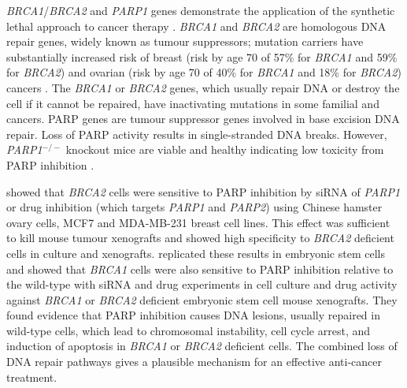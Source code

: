 \textit{BRCA1}/\textit{BRCA2} and \textit{PARP1} genes demonstrate the application of the \gls{synthetic lethal} approach to cancer therapy \citep{Ashworth2008, Kaelin2005}. \textit{BRCA1} and \textit{BRCA2} are homologous \acrshort{DNA} repair genes, widely known as \glspl{tumour suppressor}; \gls{mutation} carriers have substantially increased risk of breast (risk by age 70 of 57\% for \textit{BRCA1} and 59\% for \textit{BRCA2}) and ovarian (risk by age 70 of 40\% for \textit{BRCA1} and 18\% for \textit{BRCA2}) cancers \citep{Chen2007}. The \textit{BRCA1} or \textit{BRCA2} genes, which usually repair \acrshort{DNA} or destroy the cell if it cannot be repaired, have inactivating  \glspl{mutation} in some \gls{familial} and  cancers. \acrfull{PARP} genes are \gls{tumour suppressor} genes involved in base excision \acrshort{DNA} repair. Loss of PARP activity results in single-stranded \acrshort{DNA} breaks. However, \textit{PARP1}$^{-/-}$ knockout mice are viable and healthy indicating low toxicity from PARP inhibition \citep{Bryant2005}.  

\citet{Bryant2005} showed that \textit{BRCA2} cells were sensitive to PARP inhibition by \gls{siRNA} of \textit{PARP1} or drug inhibition (which targets \textit{PARP1} and \textit{PARP2}) using Chinese hamster ovary cells, MCF7 and MDA-MB-231 breast cell lines. This effect was sufficient to kill mouse tumour xenografts and showed high specificity to \textit{BRCA2} deficient cells in culture and xenografts. \citet{Farmer2005} replicated these results in embryonic stem cells and showed that \textit{BRCA1} cells were also sensitive to PARP inhibition relative to the \gls{wild-type} with \gls{siRNA} and drug experiments in cell culture and drug activity against \textit{BRCA1} or \textit{BRCA2} deficient embryonic stem cell mouse xenografts. They found evidence that PARP inhibition causes \acrshort{DNA} lesions, usually repaired in \gls{wild-type} cells, which lead to chromosomal instability, cell cycle arrest, and induction of apoptosis in \textit{BRCA1} or \textit{BRCA2} deficient cells. The combined loss of \acrshort{DNA} repair \glspl{pathway} gives a plausible mechanism for an effective anti-cancer treatment.  

